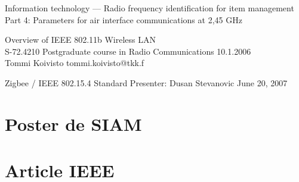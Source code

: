 \documentclass[11pt, a4paper, twoside]{book}
\begin{document}
\begin{thebibliography}{9}
Information technology — Radio
frequency identification for item
management\\
Part 4:
Parameters for air interface
communications at 2,45 GHz 

Overview of IEEE 802.11b Wireless LAN\\
S-72.4210 Postgraduate course in Radio Communications
10.1.2006\\
Tommi Koivisto
tommi.koivisto@tkk.f

Zigbee / IEEE 802.15.4
Standard
Presenter: Dusan Stevanovic
June 20, 2007
\end{thebibliography}
\let\cleardoublepage\clearpage

\appendix
\printnomenclature
\chapter{Poster de SIAM}


\chapter{Article IEEE}


\end{document}
